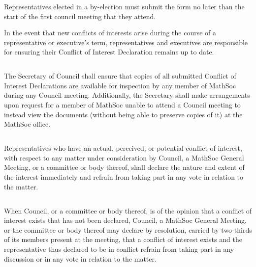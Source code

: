 \subsubsection{} 

Representatives elected in a by-election must submit the form no later than the start of the first council meeting that they attend.

\subsubection{} 

In the event that new conflicts of interests arise during the course of a representative or executive’s term, representatives and executives are responsible for ensuring their Conflict of Interest Declaration remains up to date.

\subsection{} 

The Secretary of Council shall ensure that copies of all submitted Conflict of Interest Declarations are available for inspection by any member of MathSoc during any Council meeting. Additionally, the Secretary shall make arrangements upon request for a member of MathSoc unable to attend a Council meeting to instead view the documents (without being able to preserve copies of it) at the MathSoc office.

\subsection{} 

Representatives who have an actual, perceived, or potential conflict of interest, with respect to any matter under consideration by Council, a MathSoc General Meeting, or a committee or body thereof, shall declare the nature and extent of the interest immediately and refrain from taking part in any vote in relation to the matter.

\subsection{} 

When Council, or a committee or body thereof, is of the opinion that a conflict of interest exists that has not been declared, Council, a MathSoc General Meeting, or the committee or body thereof may declare by resolution, carried by two-thirds of its members present at the meeting, that a conflict of interest exists and the representative thus declared to be in conflict refrain from taking part in any discussion or in any vote in relation to the matter.

